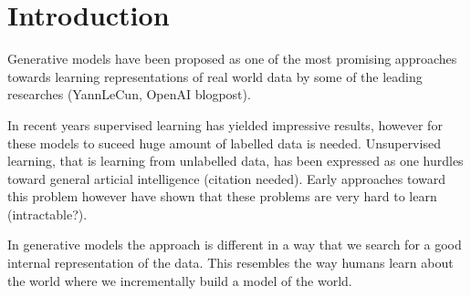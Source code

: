 \section{Introduction}
\label{sec:motivation}
Generative models have been proposed as one of the most promising approaches towards
learning representations of real world data by some of the leading researches (YannLeCun, OpenAI blogpost).

In recent years supervised learning has yielded impressive results,
however for these models to suceed huge amount of labelled data is needed.
Unsupervised learning, that is learning from unlabelled data, has been expressed
as one hurdles toward general articial intelligence (citation needed).
Early approaches toward this problem however have shown that these problems are very hard to learn (intractable?).

In generative models the approach is different in a way that
we search for a good internal representation of the data.
This resembles the way humans learn about the world where we incrementally build
a model of the world.


